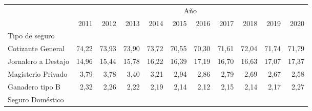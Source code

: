 \begin{tabular}{lllllllllll}
\cline{1-11}
\multicolumn{1}{c}{} &
  \multicolumn{10}{|c}{Año} \\
\multicolumn{1}{c}{} &
  \multicolumn{1}{|r}{2011} &
  \multicolumn{1}{r}{2012} &
  \multicolumn{1}{r}{2013} &
  \multicolumn{1}{r}{2014} &
  \multicolumn{1}{r}{2015} &
  \multicolumn{1}{r}{2016} &
  \multicolumn{1}{r}{2017} &
  \multicolumn{1}{r}{2018} &
  \multicolumn{1}{r}{2019} &
  \multicolumn{1}{r}{2020} \\
\cline{1-11}
\multicolumn{1}{l}{Tipo de seguro} &
  \multicolumn{1}{|r}{} &
  \multicolumn{1}{r}{} &
  \multicolumn{1}{r}{} &
  \multicolumn{1}{r}{} &
  \multicolumn{1}{r}{} &
  \multicolumn{1}{r}{} &
  \multicolumn{1}{r}{} &
  \multicolumn{1}{r}{} &
  \multicolumn{1}{r}{} &
  \multicolumn{1}{r}{} \\
\multicolumn{1}{l}{\hspace{1em}Cotizante General} &
  \multicolumn{1}{|r}{74,22} &
  \multicolumn{1}{r}{73,93} &
  \multicolumn{1}{r}{73,90} &
  \multicolumn{1}{r}{73,72} &
  \multicolumn{1}{r}{70,55} &
  \multicolumn{1}{r}{70,30} &
  \multicolumn{1}{r}{71,61} &
  \multicolumn{1}{r}{72,04} &
  \multicolumn{1}{r}{71,74} &
  \multicolumn{1}{r}{71,79} \\
\multicolumn{1}{l}{\hspace{1em}Jornalero a Destajo} &
  \multicolumn{1}{|r}{14,96} &
  \multicolumn{1}{r}{15,44} &
  \multicolumn{1}{r}{15,78} &
  \multicolumn{1}{r}{16,22} &
  \multicolumn{1}{r}{16,39} &
  \multicolumn{1}{r}{17,19} &
  \multicolumn{1}{r}{16,70} &
  \multicolumn{1}{r}{16,63} &
  \multicolumn{1}{r}{17,07} &
  \multicolumn{1}{r}{17,37} \\
\multicolumn{1}{l}{\hspace{1em}Magisterio Privado} &
  \multicolumn{1}{|r}{3,79} &
  \multicolumn{1}{r}{3,78} &
  \multicolumn{1}{r}{3,40} &
  \multicolumn{1}{r}{3,21} &
  \multicolumn{1}{r}{2,94} &
  \multicolumn{1}{r}{2,86} &
  \multicolumn{1}{r}{2,79} &
  \multicolumn{1}{r}{2,69} &
  \multicolumn{1}{r}{2,67} &
  \multicolumn{1}{r}{2,58} \\
\multicolumn{1}{l}{\hspace{1em}Ganadero tipo B} &
  \multicolumn{1}{|r}{2,32} &
  \multicolumn{1}{r}{2,26} &
  \multicolumn{1}{r}{2,22} &
  \multicolumn{1}{r}{2,19} &
  \multicolumn{1}{r}{2,14} &
  \multicolumn{1}{r}{2,12} &
  \multicolumn{1}{r}{2,15} &
  \multicolumn{1}{r}{2,14} &
  \multicolumn{1}{r}{2,17} &
  \multicolumn{1}{r}{2,27} \\
\multicolumn{1}{l}{\hspace{1em}Seguro Doméstico} &

\end{tabular}
